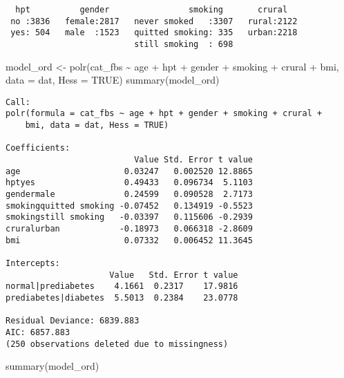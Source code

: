 \documentclass[
  letterpaper,
  DIV=11,
  numbers=noendperiod]{scrartcl}
\newenvironment{Shaded}{\begin{snugshade}}{\end{snugshade}}
\newcommand{\AttributeTok}[1]{\textcolor[rgb]{0.40,0.45,0.13}{#1}}
\newcommand{\ConstantTok}[1]{\textcolor[rgb]{0.56,0.35,0.01}{#1}}
\newcommand{\FunctionTok}[1]{\textcolor[rgb]{0.28,0.35,0.67}{#1}}
\newcommand{\NormalTok}[1]{\textcolor[rgb]{0.00,0.23,0.31}{#1}}
\newcommand{\OtherTok}[1]{\textcolor[rgb]{0.00,0.23,0.31}{#1}}
\newcommand{\SpecialCharTok}[1]{\textcolor[rgb]{0.37,0.37,0.37}{#1}}
\begin{document}
\begin{verbatim}
  hpt          gender                smoking       crural    
 no :3836   female:2817   never smoked   :3307   rural:2122  
 yes: 504   male  :1523   quitted smoking: 335   urban:2218  
                          still smoking  : 698               
\end{verbatim}

\begin{Shaded}
\begin{Highlighting}[]
\NormalTok{model\_ord }\OtherTok{\textless{}{-}} \FunctionTok{polr}\NormalTok{(cat\_fbs }\SpecialCharTok{\textasciitilde{}}\NormalTok{ age }\SpecialCharTok{+}\NormalTok{ hpt }\SpecialCharTok{+}\NormalTok{ gender }\SpecialCharTok{+}\NormalTok{ smoking }\SpecialCharTok{+}\NormalTok{ crural }\SpecialCharTok{+}\NormalTok{ bmi, }\AttributeTok{data =}\NormalTok{ dat, }\AttributeTok{Hess =} \ConstantTok{TRUE}\NormalTok{)}
\FunctionTok{summary}\NormalTok{(model\_ord)}
\end{Highlighting}
\end{Shaded}

\begin{verbatim}
Call:
polr(formula = cat_fbs ~ age + hpt + gender + smoking + crural + 
    bmi, data = dat, Hess = TRUE)

Coefficients:
                          Value Std. Error t value
age                     0.03247   0.002520 12.8865
hptyes                  0.49433   0.096734  5.1103
gendermale              0.24599   0.090528  2.7173
smokingquitted smoking -0.07452   0.134919 -0.5523
smokingstill smoking   -0.03397   0.115606 -0.2939
cruralurban            -0.18973   0.066318 -2.8609
bmi                     0.07332   0.006452 11.3645

Intercepts:
                     Value   Std. Error t value
normal|prediabetes    4.1661  0.2317    17.9816
prediabetes|diabetes  5.5013  0.2384    23.0778

Residual Deviance: 6839.883 
AIC: 6857.883 
(250 observations deleted due to missingness)
\end{verbatim}

\begin{Shaded}
\begin{Highlighting}[]
\FunctionTok{summary}\NormalTok{(model\_ord)}
\end{Highlighting}
\end{Shaded}
\end{document}
